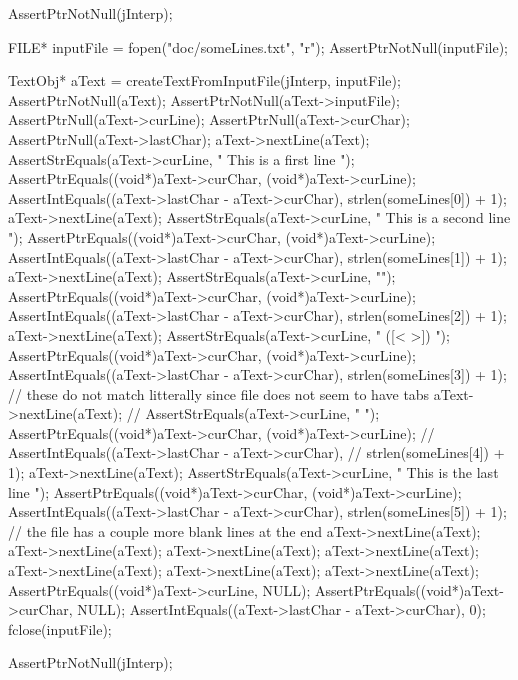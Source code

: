 \startCTest
  AssertPtrNotNull(jInterp);

  FILE* inputFile = fopen("doc/someLines.txt", "r");
  AssertPtrNotNull(inputFile);
  
  TextObj* aText = createTextFromInputFile(jInterp, inputFile);
  AssertPtrNotNull(aText);
  AssertPtrNotNull(aText->inputFile);
  AssertPtrNull(aText->curLine);
  AssertPtrNull(aText->curChar);
  AssertPtrNull(aText->lastChar);
  aText->nextLine(aText);
  AssertStrEquals(aText->curLine, "  This is a first line  \n");
  AssertPtrEquals((void*)aText->curChar, (void*)aText->curLine);
  AssertIntEquals((aText->lastChar - aText->curChar),
                        strlen(someLines[0]) + 1);
  aText->nextLine(aText);
  AssertStrEquals(aText->curLine, "  This is a second line   \n");
  AssertPtrEquals((void*)aText->curChar, (void*)aText->curLine);
  AssertIntEquals((aText->lastChar - aText->curChar),
                        strlen(someLines[1]) + 1);
  aText->nextLine(aText);
  AssertStrEquals(aText->curLine, "\n");
  AssertPtrEquals((void*)aText->curChar, (void*)aText->curLine);
  AssertIntEquals((aText->lastChar - aText->curChar),
                        strlen(someLines[2]) + 1);
  aText->nextLine(aText);
  AssertStrEquals(aText->curLine, " ([<{ }>]) \n");
  AssertPtrEquals((void*)aText->curChar, (void*)aText->curLine);
  AssertIntEquals((aText->lastChar - aText->curChar),
                        strlen(someLines[3]) + 1);
  // these do not match litterally since file does not seem to have tabs
  aText->nextLine(aText);
//  AssertStrEquals(aText->curLine, "     	\n");
  AssertPtrEquals((void*)aText->curChar, (void*)aText->curLine);
//  AssertIntEquals((aText->lastChar - aText->curChar),
//                        strlen(someLines[4]) + 1);
  aText->nextLine(aText);
  AssertStrEquals(aText->curLine, "  This is the last line  \n");
  AssertPtrEquals((void*)aText->curChar, (void*)aText->curLine);
  AssertIntEquals((aText->lastChar - aText->curChar),
                        strlen(someLines[5]) + 1);
  // the file has a couple more blank lines at the end
  aText->nextLine(aText);
  aText->nextLine(aText);
  aText->nextLine(aText);
  aText->nextLine(aText);
  aText->nextLine(aText);
  aText->nextLine(aText);
  aText->nextLine(aText);
  AssertPtrEquals((void*)aText->curLine, NULL);
  AssertPtrEquals((void*)aText->curChar, NULL);
  AssertIntEquals((aText->lastChar - aText->curChar), 0);
  fclose(inputFile);
\stopCTest
\stopTestCase

\startCTest
  AssertPtrNotNull(jInterp);

